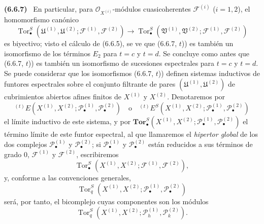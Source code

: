 \documentclass[10pt,oneside]{book}
\newcommand{\oldpage}[2][]{\setcounter{footnote}{0}\marginpar{\scriptsize\textbf{#1}~|~#2}\ignorespaces}
\newenvironment{env}[1][]{\par\medskip\noindent\textbf{(#1)}\ }{\par}
\begin{document}
\begin{env}[6.6.7]
En particular, para $\mathscr O_{X^{(i)}}$-módulos cuasicoherentes
$\mathscr F^{(i)}$ ($i=1,2$), el homomorfismo canónico
\[
  \operatorname{Tor}_\bullet^S
  (\mathfrak U^{(1)},\mathfrak U^{(2)};
   \mathscr F^{(1)},\mathscr F^{(2)})
  \longrightarrow
  \operatorname{Tor}_\bullet^S
  (\mathfrak V^{(1)},\mathfrak V^{(2)};
   \mathscr F^{(1)},\mathscr F^{(2)})
\]
es biyectivo; visto el cálculo de (6.6.5), se ve que (6.6.7, $t$)) es también
un isomorfismo de los términos $E_2$ para $t=c$ y $t=d$. Se concluye como
antes que (6.6.7, $t$)) es también un isomorfismo de sucesiones espectrales
para $t=c$ y $t=d$.
\oldpage[III]{157}
Se puede considerar que los isomorfismos (6.6.7, $t$)) definen sistemas
inductivos de funtores espectrales sobre el conjunto filtrante de pares
$(\mathfrak U^{(1)},\mathfrak U^{(2)})$ de cubrimientos abiertos afines
finitos de $X^{(1)}$ y $X^{(2)}$. Denotaremos por
\[
  {}^{(t)}E
  (X^{(1)},X^{(2)};
   \mathscr P_\bullet^{(1)},\mathscr P_\bullet^{(2)})
  \quad\text{o}\quad
  {}^{(t)}E^S
  (X^{(1)},X^{(2)};
   \mathscr P_\bullet^{(1)},\mathscr P_\bullet^{(2)})
\]
el límite inductivo de este sistema, y por
$\mathbf{Tor}_\bullet^S
(X^{(1)},X^{(2)};\mathscr P_\bullet^{(1)},\mathscr P_\bullet^{(2)})$
el término límite de este funtor espectral, al que llamaremos el
\emph{hipertor global} de los dos complejos $\mathscr P_\bullet^{(1)}$ y
$\mathscr P_\bullet^{(2)}$; si $\mathscr P_\bullet^{(1)}$ y
$\mathscr P_\bullet^{(2)}$ están reducidos a sus términos de grado 0,
$\mathscr F^{(1)}$ y $\mathscr F^{(2)}$, escribiremos
\[
  \operatorname{Tor}_\bullet^S
  (X^{(1)},X^{(2)};\mathscr F^{(1)},\mathscr F^{(2)}),
\]
y, conforme a las convenciones generales,
\[
  \operatorname{Tor}_q^S
  (X^{(1)},X^{(2)};\mathscr P_\bullet^{(1)},\mathscr P_\bullet^{(2)})
\]
será, por tanto, el bicomplejo cuyas componentes son los módulos
\[
  \operatorname{Tor}_q^S
  (X^{(1)},X^{(2)};\mathscr P_h^{(1)},\mathscr P_k^{(2)}).
\]
\end{env}
\end{document}
